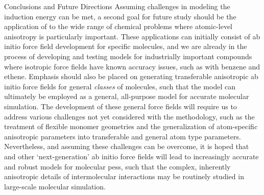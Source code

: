 \begin{chapter}{Conclusions and Future Directions}
Assuming challenges in modeling the induction energy can be met, a second goal
for future study should be the application of \mastiff to the wide range of
chemical problems where atomic-level anisotropy is particularly important.
These applications can initially consist of ab initio force field development
for specific molecules, and we are already in the process of developing and
testing models for industrially important compounds where
isotropic force fields have known accuracy issues, such as with benzene and
ethene.
Emphasis should also be placed on generating transferable anisotropic ab initio force
fields for general \emph{classes} of molecules, such that the \mastiff model
can ultimately be employed as a general, all-purpose model for accurate molecular
simulation. The development of these general force fields will require us to address various
challenges not yet considered with the \mastiff methodology, such as the
treatment of flexible monomer geometries and the generalization of
atom-specific anisotropic parameters into transferable and general atom type parameters.
Nevertheless, and assuming these challenges can be overcome, it is hoped that
\mastiff and other `next-generation' ab initio force fields will lead to increasingly accurate
and robust models for molecular \glspl{pes},
such that the complex, inherently anisotropic details of
intermolecular interactions may be routinely studied in
large-scale molecular simulation.

\end{chapter}
